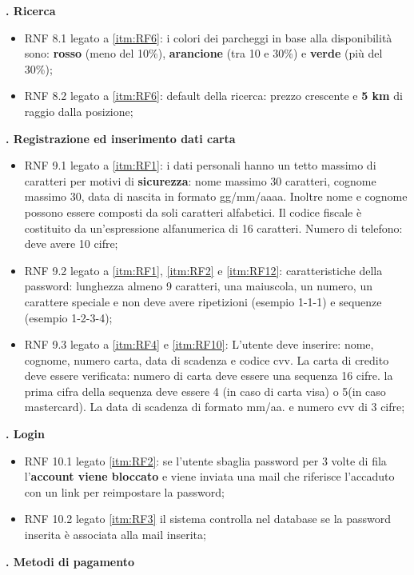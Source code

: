 \textbf{. Ricerca}
\begin{itemize}
    \item RNF 8.1 legato a \ref{itm:RF6}: i colori dei parcheggi in base alla disponibilità sono: \textbf{rosso} (meno del 10\%), \textbf{arancione} (tra 10 e 30\%) e \textbf{verde} (più del 30\%);

    \item RNF 8.2 legato a \ref{itm:RF6}: default della ricerca: prezzo crescente e \textbf{5 km} di raggio dalla posizione;
\end{itemize}
\textbf{. Registrazione ed inserimento dati carta}
\begin{itemize}
    \item RNF 9.1 legato a \ref{itm:RF1}: i dati personali hanno un tetto massimo di caratteri per motivi di \textbf{sicurezza}: nome massimo 30 caratteri, cognome massimo 30, data di nascita in formato gg/mm/aaaa. Inoltre nome e cognome possono essere composti da soli caratteri alfabetici. Il codice fiscale è costituito da un’espressione alfanumerica di 16 caratteri. Numero di telefono: deve avere 10 cifre;
    \item RNF 9.2 legato a \ref{itm:RF1}, \ref{itm:RF2} e \ref{itm:RF12}: caratteristiche della password: lunghezza almeno 9 caratteri, una maiuscola, un numero, un carattere speciale e non deve avere ripetizioni (esempio 1-1-1) e sequenze (esempio 1-2-3-4);
    \item RNF 9.3 legato a \ref{itm:RF4} e \ref{itm:RF10}: L’utente deve inserire: nome, cognome, numero carta, data di scadenza e codice cvv. La carta di credito deve essere verificata: numero di carta deve essere una sequenza 16 cifre. la prima cifra della sequenza deve essere 4 (in caso di carta visa) o 5(in caso mastercard). La data di scadenza di formato mm/aa. e numero cvv di 3 cifre;
\end{itemize}
\textbf{. Login}
\begin{itemize}
    \item RNF 10.1 legato \ref{itm:RF2}: se l’utente sbaglia password per 3 volte di fila l’\textbf{account viene bloccato} e viene inviata una mail che riferisce l’accaduto con un link per reimpostare la password;
    \item RNF 10.2 legato \ref{itm:RF3} il sistema controlla nel database se la password inserita è associata alla mail inserita;
\end{itemize}
\textbf{. Metodi di pagamento}
